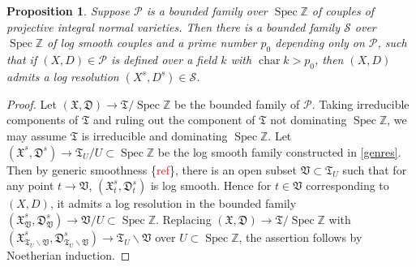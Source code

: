 \documentclass[10pt,a4paper]{amsart}
\newtheorem{proposition}{Proposition}
\DeclareMathOperator{\Spec}{Spec}
\DeclareMathOperator{\chara}{char}
\newcommand{\red}{\textcolor{red}}
\begin{document}
\begin{proposition}\label{genres1}
    Suppose $\mathcal P$ is a bounded family over $\Spec\mathbb Z$ of couples of projective integral normal varieties. Then there is a bounded family $\mathcal S$ over $\Spec \mathbb Z$ of log smooth couples and a prime number $p_0$ depending only on $\mathcal P$, such that if $(X,D)\in \mathcal P$ is defined over a field $k$ with $\chara k>p_0$, then $(X,D)$ admits a log resolution $(X^s,D^s)\in\mathcal S$.
\end{proposition}

\begin{proof}
    Let $(\mathfrak X,\mathfrak D)\to \mathfrak T/\Spec \mathbb Z$ be the bounded family of $\mathcal P$. Taking irreducible components of $\mathfrak T$ and ruling out the component of $\mathfrak T$ not dominating $\Spec \mathbb Z$, we may assume $\mathfrak T$ is irreducible and dominating $\Spec\mathbb Z$. Let $(\mathfrak X^s,\mathfrak D^s)\to \mathfrak T_U/U\subset\Spec\mathbb Z$ be the log smooth family constructed in \ref{genres}.   Then by generic smoothness \{\red{ref}\}, there is an open subset $\mathfrak V\subset \mathfrak T_U$ such that for any point $t\to \mathfrak V$, $(\mathfrak X^s_t,\mathfrak D^s_t)$ is log smooth. Hence for $t\in \mathfrak V$ corresponding to $(X,D)$, it admits a log resolution in the bounded family $(\mathfrak X^s_\mathfrak V,\mathfrak D^s_\mathfrak V)\to \mathfrak V/U\subset \Spec\mathbb Z$. Replacing $(\mathfrak X,\mathfrak D)\to \mathfrak T/\Spec \mathbb Z$ with $(\mathfrak X^s_{\mathfrak T_U\backslash\mathfrak V},\mathfrak D^s_{\mathfrak T_U\backslash\mathfrak V})\to  \mathfrak {T}_U\backslash\mathfrak V$ over $U\subset \Spec\mathbb Z$, the assertion follows by Noetherian induction.
\end{proof}
\end{document}
